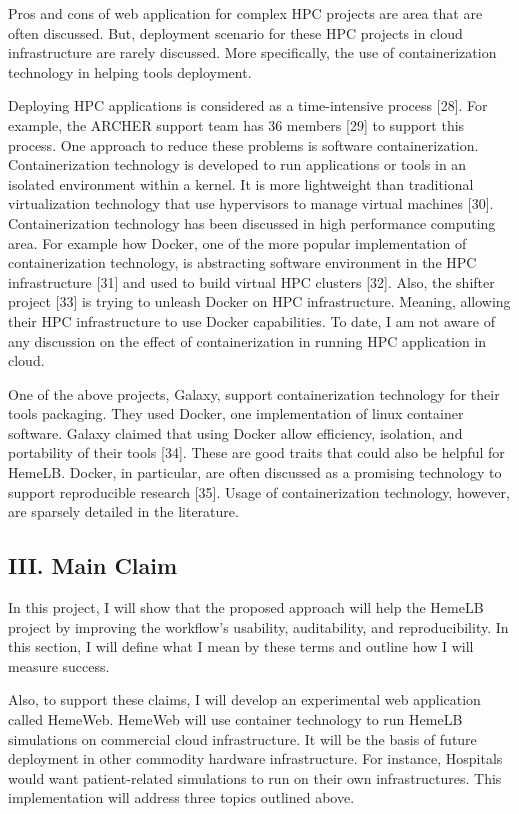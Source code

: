 \documentclass[]{article}
\begin{document}
Pros and cons of web application for complex HPC projects are area that
are often discussed. But, deployment scenario for these HPC projects in
cloud infrastructure are rarely discussed. More specifically, the use of
containerization technology in helping tools deployment.

Deploying HPC applications is considered as a time-intensive process
{[}28{]}. For example, the ARCHER support team has 36 members {[}29{]}
to support this process. One approach to reduce these problems is
software containerization. Containerization technology is developed to
run applications or tools in an isolated environment within a kernel. It
is more lightweight than traditional virtualization technology that use
hypervisors to manage virtual machines {[}30{]}. Containerization
technology has been discussed in high performance computing area. For
example how Docker, one of the more popular implementation of
containerization technology, is abstracting software environment in the
HPC infrastructure {[}31{]} and used to build virtual HPC clusters
{[}32{]}. Also, the shifter project {[}33{]} is trying to unleash Docker
on HPC infrastructure. Meaning, allowing their HPC infrastructure to use
Docker capabilities. To date, I am not aware of any discussion on the
effect of containerization in running HPC application in cloud.

One of the above projects, Galaxy, support containerization technology
for their tools packaging. They used Docker, one implementation of linux
container software. Galaxy claimed that using Docker allow efficiency,
isolation, and portability of their tools {[}34{]}. These are good
traits that could also be helpful for HemeLB. Docker, in particular, are
often discussed as a promising technology to support reproducible
research {[}35{]}. Usage of containerization technology, however, are
sparsely detailed in the literature.

\subsection{III. Main Claim}\label{iii.-main-claim}

In this project, I will show that the proposed approach will help the
HemeLB project by improving the workflow's usability, auditability, and
reproducibility. In this section, I will define what I mean by these
terms and outline how I will measure success.

Also, to support these claims, I will develop an experimental web
application called HemeWeb. HemeWeb will use container technology to run
HemeLB simulations on commercial cloud infrastructure. It will be the
basis of future deployment in other commodity hardware infrastructure.
For instance, Hospitals would want patient-related simulations to run on
their own infrastructures. This implementation will address three topics
outlined above.
\end{document}
